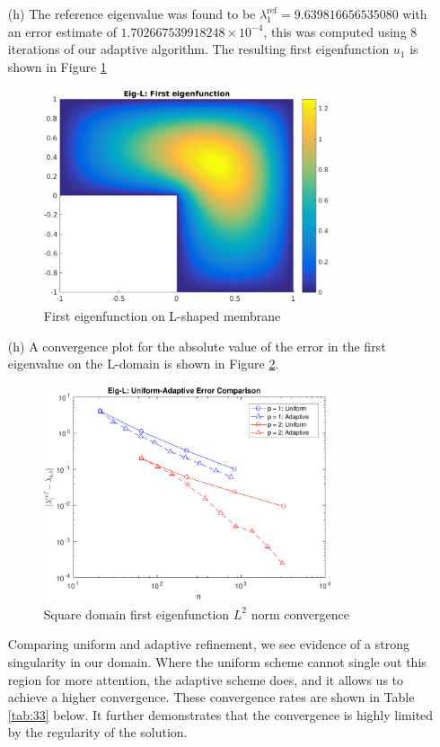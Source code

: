 \documentclass{article}
\begin{document}
\begin{itemize}
	\item[(h)] The reference eigenvalue was found to be \(\lambda_1^\text{ref} =  9.639816656535080\) with an error estimate of \(1.702667539918248 \times 10^{-4} \), this was computed using 8 iterations of our adaptive algorithm. The resulting first eigenfunction \(u_1\) is shown in Figure \ref{fig:eigsl1}
	\begin{figure}[H]
		\centering
		\includegraphics[width=0.8\textwidth]{eigl_eigfun.pdf}
		\caption{First eigenfunction on L-shaped membrane}
		\label{fig:eigsl1}
	\end{figure}
	
	\item[(h)] A convergence plot for the absolute value of the error in the first eigenvalue on the L-domain is shown in Figure \ref{fig:eigl_conv_1}.
	\begin{figure}[H]
		\centering
		\includegraphics[width=0.8\textwidth]{eigl_conv_1.pdf}
		\caption{Square domain first eigenfunction \(L^2\) norm convergence}
		\label{fig:eigl_conv_1}
	\end{figure}
	Comparing uniform and adaptive refinement, we see evidence of a strong singularity in our domain. Where the uniform scheme cannot single out this region for more attention, the adaptive scheme does, and it allows us to achieve a higher convergence. These convergence rates are shown in Table \ref{tab:33} below. It further demonstrates that the convergence is highly limited by the regularity of the solution.
	

\end{itemize}
\end{document}
